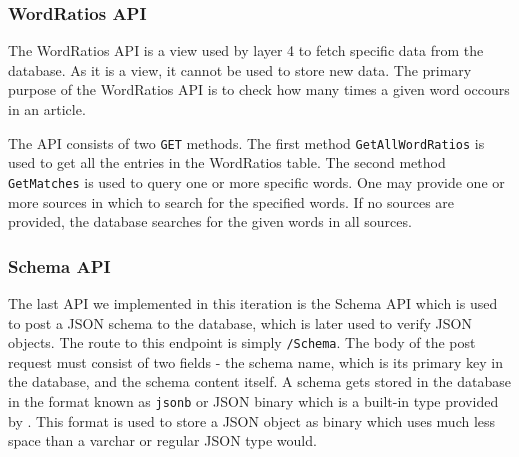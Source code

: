 \subsubsection{WordRatios API}
The WordRatios API is a view used by layer 4 to fetch specific data from the database.
As it is a view, it cannot be used to store new data. 
The primary purpose of the WordRatios API is to check how many times a given word occours in an article.

The API consists of two \texttt{GET} methods. 
The first method \texttt{GetAllWordRatios} is used to get all the entries in the WordRatios table.
The second method \texttt{GetMatches} is used to query one or more specific words. 
One may provide one or more sources in which to search for the specified words.
If no sources are provided, the database searches for the given words in all sources.



\subsubsection{Schema API}

The last API we implemented in this iteration is the Schema API which is used to post a JSON schema to the database, which is later used to verify JSON objects.
The route to this endpoint is simply \texttt{/Schema}. 
The body of the post request must consist of two fields - the schema name, which is its primary key in the database, and the schema content itself. 
A schema gets stored in the database in the format known as \texttt{jsonb} or JSON binary which is a built-in type provided by \postgres{}.
This format is used to store a JSON object as binary which uses much less space than a varchar or regular JSON type would.



